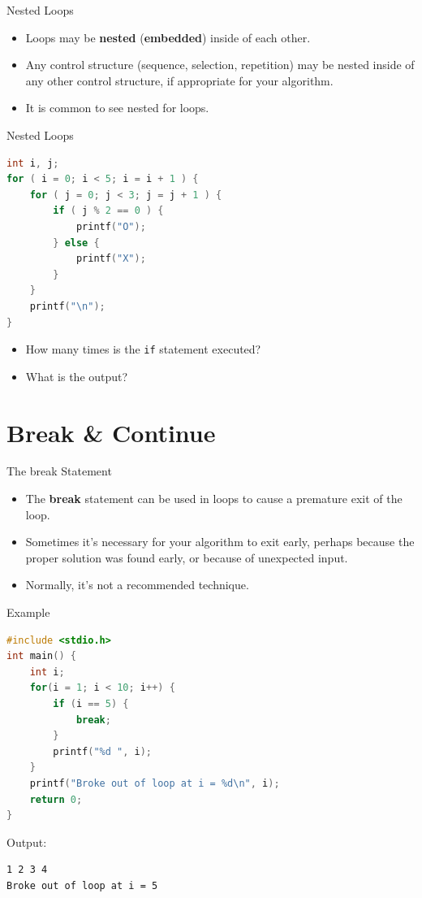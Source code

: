 \documentclass[graphics]{beamer}
\begin{document}
\begin{frame}{Nested Loops}
    \begin{itemize}
        \item Loops may be \textbf{nested} (\textbf{embedded}) inside of each other.
        \item Any control structure (sequence, selection, repetition) may be nested inside of any other control structure, if appropriate for your algorithm.
        \item It is common to see nested for loops.
    \end{itemize}
\end{frame}

\begin{frame}[fragile]{Nested Loops}
    \begin{lstlisting}[language=C,basicstyle=\footnotesize,keywordstyle=\color{blue},commentstyle=\color{green},showstringspaces=false,stringstyle=\color{red}]
int i, j;
for ( i = 0; i < 5; i = i + 1 ) {
    for ( j = 0; j < 3; j = j + 1 ) {
        if ( j % 2 == 0 ) {
            printf("O");
        } else {
            printf("X");
        }
    }
    printf("\n");
}
    \end{lstlisting}
    \begin{itemize}
        \item How many times is the \texttt{if} statement executed?
        \item What is the output?
    \end{itemize}
\end{frame}

\section*{Break \& Continue}
\begin{frame}{The break Statement}
    \begin{itemize}
        \item The \textbf{break} statement can be used in loops to cause a premature exit of the loop.
        \item Sometimes it's necessary for your algorithm to exit early, perhaps because the proper solution was found early, or because of unexpected input.
        \item Normally, it's not a recommended technique.
    \end{itemize}
\end{frame}

\begin{frame}[fragile]{Example}
    \begin{lstlisting}[language=C,basicstyle=\footnotesize,keywordstyle=\color{blue},commentstyle=\color{green},showstringspaces=false,stringstyle=\color{red}]
#include <stdio.h>
int main() {
    int i;
    for(i = 1; i < 10; i++) {
        if (i == 5) {
            break;
        }
        printf("%d ", i);
    }
    printf("Broke out of loop at i = %d\n", i);
    return 0;
}
    \end{lstlisting}
    Output:
    \begin{verbatim}
1 2 3 4
Broke out of loop at i = 5
    \end{verbatim}
\end{frame}
\end{document}
